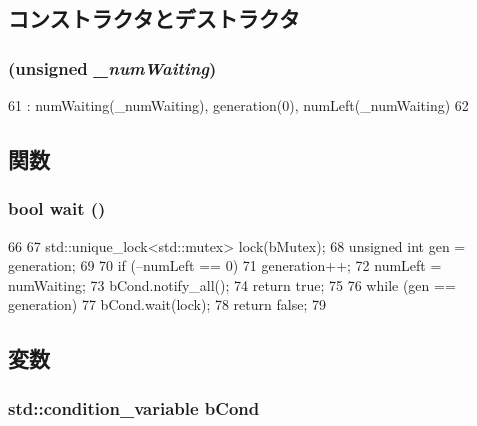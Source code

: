 \subsection{コンストラクタとデストラクタ}
\hypertarget{classBarrier_ab11eb47d1338adc267b8ccb093d33197}{
\subsubsection[{Barrier}]{ (unsigned {\em \_\-numWaiting})}}
\label{classBarrier_ab11eb47d1338adc267b8ccb093d33197}



\begin{DoxyCode}
61         : numWaiting(_numWaiting), generation(0), numLeft(_numWaiting)
62     {}
\end{DoxyCode}


\subsection{関数}
\hypertarget{classBarrier_ab86f338cf229c8dd15d854493ff43ff6}{
\subsubsection[{wait}]{\setlength{\rightskip}{0pt plus 5cm}bool wait ()}}
\label{classBarrier_ab86f338cf229c8dd15d854493ff43ff6}



\begin{DoxyCode}
66     {
67         std::unique_lock<std::mutex> lock(bMutex);
68         unsigned int gen = generation;
69 
70         if (--numLeft == 0) {
71             generation++;
72             numLeft = numWaiting;
73             bCond.notify_all();
74             return true;
75         }
76         while (gen == generation)
77             bCond.wait(lock);
78         return false;
79     }
\end{DoxyCode}


\subsection{変数}
\hypertarget{classBarrier_ae060431453d3ba5ae5334759419545a1}{
\subsubsection[{bCond}]{\setlength{\rightskip}{0pt plus 5cm}std::condition\_\-variable {\bf bCond}}}
\label{classBarrier_ae060431453d3ba5ae5334759419545a1}


